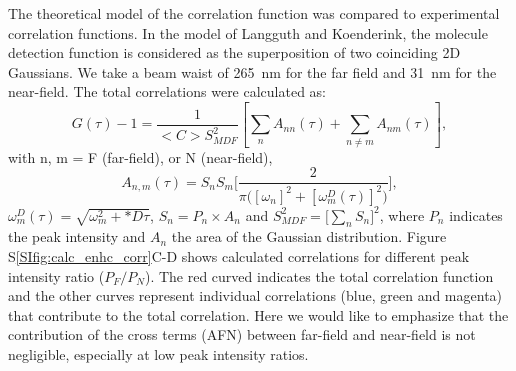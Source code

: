 The theoretical model of the correlation function was compared to experimental correlation functions.
In the model of Langguth and Koenderink\cite{langguth2016exact}, the molecule detection function is considered as the superposition of 
two coinciding 2D Gaussians.
We take a beam waist of \SI{265}{\nm} for the far field and \SI{31}{\nm} for the near-field.
The total correlations were calculated as:
\begin{equation}
  G(\tau)-1 = \frac{1}{<C>S_{MDF}^2}[\sum_{n}A_{nn}(\tau) + \sum_{n\neq m}A_{nm}(\tau)],
  \label{eq:far-near-gauss}
\end{equation}
with n, m = F (far-field), or N (near-field),
\begin{equation}
  A_{n,m}(\tau)=S_nS_m\Bigg[\frac{2}{\pi\Big([\omega_n]^2 + [\omega_m^D(\tau)]^2 \Big)}\Bigg] ,
  \label{eq:area-gauss}
\end{equation}
$\omega_m^D(\tau)=\sqrt{\omega_m^2 + *D\tau}$, $S_n=P_n\times A_n$ and $S_{MDF}^2=\Big[\sum_{n}S_n\Big]^2$,
where $P_n$ indicates the peak intensity and $A_n$ the area of the Gaussian distribution. 
Figure S\ref{SIfig:calc_enhc_corr}C-D shows calculated correlations for different peak intensity ratio ($P_F/P_N$). 
The red curved indicates the total correlation function and the other curves represent individual correlations (blue, green and magenta) that contribute to the total correlation.
Here we would like to emphasize that the contribution of the cross terms (AFN) between far-field and near-field is not negligible, especially at low peak intensity ratios.

